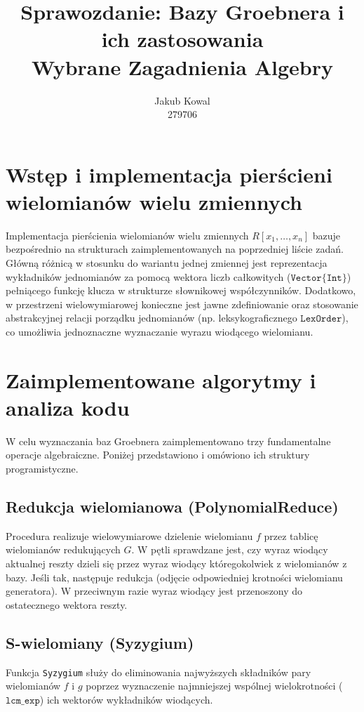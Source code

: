 \documentclass[12pt,a4paper]{article}
\title{\textbf{Sprawozdanie: Bazy Groebnera i ich zastosowania}\\Wybrane Zagadnienia Algebry}
\author{Jakub Kowal\\279706}
\date{}
\begin{document}
\maketitle

\section{Wstęp i implementacja pierścieni wielomianów wielu zmiennych}
Implementacja pierścienia wielomianów wielu zmiennych $R[x_1, \dots, x_n]$ bazuje bezpośrednio na strukturach zaimplementowanych na poprzedniej liście zadań. Główną różnicą w stosunku do wariantu jednej zmiennej jest reprezentacja wykładników jednomianów za pomocą wektora liczb całkowitych ($\mathtt{Vector\{Int\}}$) pełniącego funkcję klucza w strukturze słownikowej współczynników. Dodatkowo, w przestrzeni wielowymiarowej konieczne jest jawne zdefiniowanie oraz stosowanie abstrakcyjnej relacji porządku jednomianów (np. leksykograficznego $\mathtt{LexOrder}$), co umożliwia jednoznaczne wyznaczanie wyrazu wiodącego wielomianu.

\section{Zaimplementowane algorytmy i analiza kodu}
W celu wyznaczania baz Groebnera zaimplementowano trzy fundamentalne operacje algebraiczne. Poniżej przedstawiono i omówiono ich struktury programistyczne.

\subsection{Redukcja wielomianowa (PolynomialReduce)}
Procedura realizuje wielowymiarowe dzielenie wielomianu $f$ przez tablicę wielomianów redukujących $G$. W pętli sprawdzane jest, czy wyraz wiodący aktualnej reszty dzieli się przez wyraz wiodący któregokolwiek z wielomianów z bazy. Jeśli tak, następuje redukcja (odjęcie odpowiedniej krotności wielomianu generatora). W przeciwnym razie wyraz wiodący jest przenoszony do ostatecznego wektora reszty.

\subsection{S-wielomiany (Syzygium)}
Funkcja \texttt{Syzygium} służy do eliminowania najwyższych składników pary wielomianów $f$ i $g$ poprzez wyznaczenie najmniejszej wspólnej wielokrotności ($\mathtt{lcm\_exp}$) ich wektorów wykładników wiodących.
\end{document}
